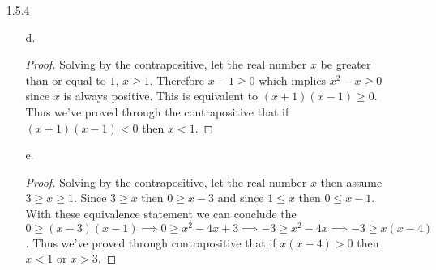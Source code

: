 \documentclass[11pt]{amsart}
\theoremstyle{definition}
\begin{document}
\begin{itemize}
\begin{itemize}
\begin{proof}
        \paragraph{Case 2:}
            If $x$ and $y$ are both even, such that $x=2k$ and $y=2j$ for $k,j\in\mathbb{Z}$ then $xy=(2k)2j=4kj=2(2kj)=2h$ where $h=2kj$ is an integer. \\
        Thus we've proved by the contrapositive that if $xy$ is odd then $x$ and $y$ must both be odd.
    \end{proof}

    \item[g.] \begin{proof}
        Solving by the contrapositive, let $x$ be odd, so that $x=2k+1$ for some $k\in\mathbb{Z}$. We'll show that $8\mid x^2-1$ if the assumption is true. Since $x=2k+1$ then $x^2-1=(2k+1)^2-1=4k^2+4k+1-1=4(k^2+k)=4k(k+1)$. Since $a(a+1)$ is even for any integer $4k(k+1)=4*2(h)=8h$ where $h\in\mathbb{Z}$ therefore $x^2-1=8h$ if $x$ is odd. Thus we've proved through the contrapositive that if $8\nmid x^2-1$ then $x$ is even.
    \end{proof}

    \item[h.] \begin{proof}
        Solving by the contrapositive, let $x\mid z$ so that $z=xk$ for some $k\in\mathbb{Z}$. Then $yz=y(xk)=x(yk)=xj$ where $j=yk$ is an integer. Thus we've proved by contrapositive that if $x\nmid yz$ then $x\nmid z$.
    \end{proof}

\end{itemize}

\item[1.5.4]
\begin{itemize}
    \item[d.] \begin{proof}
        Solving by the contrapositive, let the real number $x$ be greater than or equal to $1$, $x\ge 1$. Therefore $x-1\ge 0$ which implies $x^2-x\ge 0$ since $x$ is always positive. This is equivalent to $(x+1)(x-1)\ge 0$. Thus we've proved through the contrapositive that if $(x+1)(x-1)< 0$ then $x<1$.
    \end{proof}

    \item[e.] \begin{proof}
        Solving by the contrapositive, let the real number $x$ then assume $3\ge x\ge 1$. Since $3\ge x$ then $0\ge x-3$ and since $1\le x$ then $0\le x-1$. With these equivalence statement we can conclude the $0\ge (x-3)(x-1)\implies 0\ge x^2-4x+3\implies -3\ge x^2-4x\implies -3\ge x(x-4)$. Thus we've proved through contrapositive that if $x(x-4)>0$ then $x<1$ or $x>3$.
    \end{proof}


\end{itemize}
\end{itemize}
\end{document}
